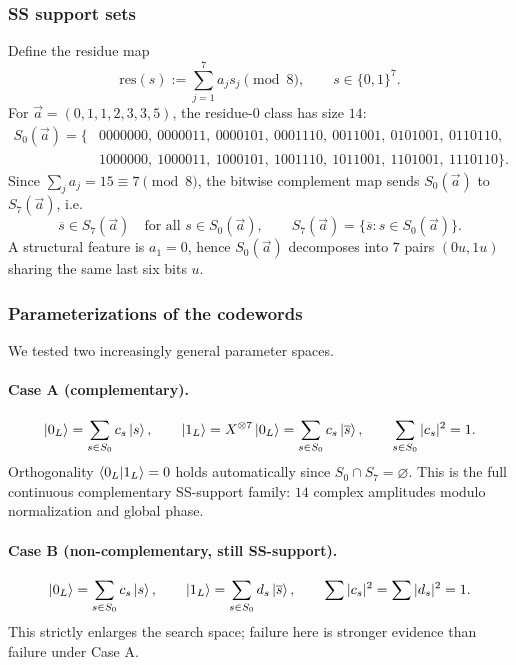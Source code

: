 \documentclass[11pt]{article}
\begin{document}
\subsubsection{SS support sets}
Define the residue map
\[
\mathrm{res}(s):=\sum_{j=1}^7 a_j s_j \pmod 8,\qquad s\in\{0,1\}^7.
\]
For \(\vec a=(0,1,1,2,3,3,5)\), the residue-\(0\) class has size \(14\):
\[
\begin{aligned}
S_0(\vec a)=\{&
0000000,\ 0000011,\ 0000101,\ 0001110,\ 0011001,\ 0101001,\ 0110110,\\
&1000000,\ 1000011,\ 1000101,\ 1001110,\ 1011001,\ 1101001,\ 1110110
\}.
\end{aligned}
\]
Since \(\sum_j a_j=15\equiv 7\pmod 8\), the bitwise complement map sends \(S_0(\vec a)\) to \(S_7(\vec a)\), i.e.
\[
\overline{s}\in S_7(\vec a)\quad\text{for all } s\in S_0(\vec a),
\qquad
S_7(\vec a)=\{\overline{s}:s\in S_0(\vec a)\}.
\]
A structural feature is \(a_1=0\), hence \(S_0(\vec a)\) decomposes into \(7\) pairs \((0u,1u)\) sharing the same last six bits \(u\).

\subsubsection{Parameterizations of the codewords}
We tested two increasingly general parameter spaces.

\paragraph{Case A (complementary).}
\[
\ket{0_L}=\sum_{s\in S_0} c_s \ket{s},\qquad
\ket{1_L}=X^{\otimes 7}\ket{0_L}=\sum_{s\in S_0} c_s \ket{\overline{s}},
\qquad
\sum_{s\in S_0}|c_s|^2=1.
\]
Orthogonality \(\braket{0_L|1_L}=0\) holds automatically since \(S_0\cap S_7=\varnothing\).
This is the full continuous complementary SS-support family: \(14\) complex amplitudes modulo normalization and global phase.

\paragraph{Case B (non-complementary, still SS-support).}
\[
\ket{0_L}=\sum_{s\in S_0} c_s \ket{s},\qquad
\ket{1_L}=\sum_{s\in S_0} d_s \ket{\overline{s}},
\qquad
\sum|c_s|^2=\sum|d_s|^2=1.
\]
This strictly enlarges the search space; failure here is stronger evidence than failure under Case A.
\end{document}
